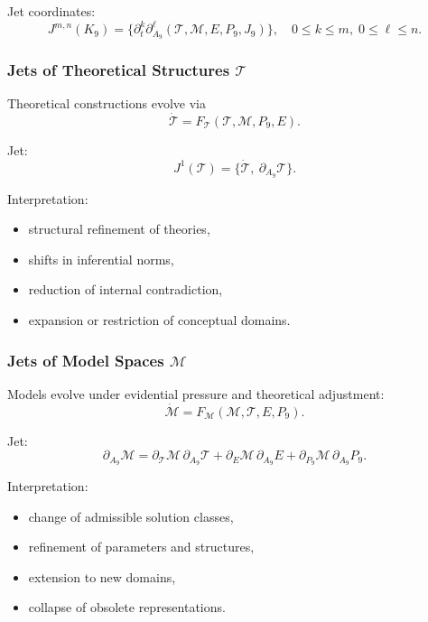 Jet coordinates:
\[
J^{m,n}(K_9)
=
\{\partial_t^k \partial_{A_9}^\ell 
(\mathcal{T},\mathcal{M},E,P_9,J_9)
\},
\quad
0\le k\le m,\;
0\le\ell\le n.
\]


\subsubsection{Jets of Theoretical Structures $\mathcal{T}$}

Theoretical constructions evolve via
\[
\dot{\mathcal{T}}=F_{\mathcal{T}}(\mathcal{T},\mathcal{M},P_9,E).
\]

Jet:
\[
J^1(\mathcal{T})
=
\{\dot{\mathcal{T}},\ \partial_{A_9}\mathcal{T}\}.
\]

Interpretation:
\begin{itemize}
    \item structural refinement of theories,
    \item shifts in inferential norms,
    \item reduction of internal contradiction,
    \item expansion or restriction of conceptual domains.
\end{itemize}


\subsubsection{Jets of Model Spaces $\mathcal{M}$}

Models evolve under evidential pressure and theoretical adjustment:
\[
\dot{\mathcal{M}}=
F_{\mathcal{M}}(\mathcal{M},\mathcal{T},E,P_9).
\]

Jet:
\[
\partial_{A_9}\mathcal{M}
=
\partial_{\mathcal{T}}\mathcal{M}\,\partial_{A_9}\mathcal{T}
+
\partial_{E}\mathcal{M}\,\partial_{A_9}E
+
\partial_{P_9}\mathcal{M}\,\partial_{A_9}P_9.
\]

Interpretation:
\begin{itemize}
    \item change of admissible solution classes,
    \item refinement of parameters and structures,
    \item extension to new domains,
    \item collapse of obsolete representations.
\end{itemize}


